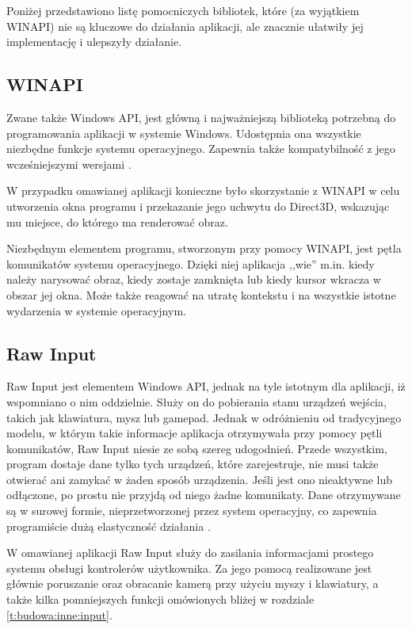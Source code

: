 	Poniżej przedstawiono listę pomocniczych bibliotek, które (za wyjątkiem WINAPI) nie są kluczowe do działania aplikacji, ale znacznie ułatwiły jej implementację i ulepszyły działanie.
	
		\subsection{WINAPI}
		\label{t:technologie:helpers:winapi}
		
		Zwane także Windows API, jest główną i najważniejszą biblioteką potrzebną do programowania aplikacji w systemie Windows. Udostępnia ona wszystkie niezbędne funkcje systemu operacyjnego. Zapewnia także kompatybilność z jego wcześniejszymi wersjami \cite{tech02}.
		
		W przypadku omawianej aplikacji konieczne było skorzystanie z WINAPI w celu utworzenia okna programu i przekazanie jego uchwytu do Direct3D, wskazując mu miejsce, do którego ma renderować obraz.
		
		Niezbędnym elementem programu, stworzonym przy pomocy WINAPI, jest pętla komunikatów systemu operacyjnego. Dzięki niej aplikacja ,,wie'' m.in. kiedy należy narysować obraz, kiedy zostaje zamknięta lub kiedy kursor wkracza w obszar jej okna. Może także reagować na utratę kontekstu i na wszystkie istotne wydarzenia w systemie operacyjnym.
		
		\subsection{Raw Input}
		\label{t:technologie:helpers:rawinput}
		
		Raw Input jest elementem Windows API, jednak na tyle istotnym dla aplikacji, iż wspomniano o nim oddzielnie. Służy on do pobierania stanu urządzeń wejścia, takich jak klawiatura, mysz lub gamepad. Jednak w odróżnieniu od tradycyjnego modelu, w którym takie informacje aplikacja otrzymywała przy pomocy pętli komunikatów, Raw Input niesie ze sobą szereg udogodnień. Przede wszystkim, program dostaje dane tylko tych urządzeń, które zarejestruje, nie musi także otwierać ani zamykać w żaden sposób urządzenia. Jeśli jest ono nieaktywne lub odłączone, po prostu nie przyjdą od niego żadne komunikaty. Dane otrzymywane są w surowej formie, nieprzetworzonej przez system operacyjny, co zapewnia programiście dużą elastyczność działania \cite{tech03}.
		
		W omawianej aplikacji Raw Input służy do zasilania informacjami prostego systemu obsługi kontrolerów użytkownika. Za jego pomocą realizowane jest głównie poruszanie oraz obracanie kamerą przy użyciu myszy i klawiatury, a także kilka pomniejszych funkcji omówionych bliżej w rozdziale \ref{t:budowa:inne:input}.
		
